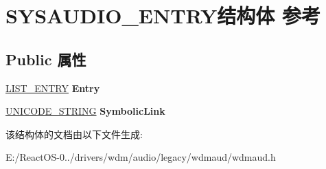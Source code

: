 \hypertarget{struct_s_y_s_a_u_d_i_o___e_n_t_r_y}{}\section{S\+Y\+S\+A\+U\+D\+I\+O\+\_\+\+E\+N\+T\+R\+Y结构体 参考}
\label{struct_s_y_s_a_u_d_i_o___e_n_t_r_y}
\subsection*{Public 属性}
\begin{DoxyCompactItemize}
\item 
\mbox{\label{struct_s_y_s_a_u_d_i_o___e_n_t_r_y_a623d7605c675016bc013762e332a3f0b}} 
\hyperlink{struct___l_i_s_t___e_n_t_r_y}{L\+I\+S\+T\+\_\+\+E\+N\+T\+RY} {\bfseries Entry}
\item 
\mbox{\label{struct_s_y_s_a_u_d_i_o___e_n_t_r_y_ac1c9923368b2d8221b1a441255919998}} 
\hyperlink{struct___u_n_i_c_o_d_e___s_t_r_i_n_g}{U\+N\+I\+C\+O\+D\+E\+\_\+\+S\+T\+R\+I\+NG} {\bfseries Symbolic\+Link}
\end{DoxyCompactItemize}


该结构体的文档由以下文件生成\+:\begin{DoxyCompactItemize}
\item 
E\+:/\+React\+O\+S-\/0../drivers/wdm/audio/legacy/wdmaud/wdmaud.\+h\end{DoxyCompactItemize}
